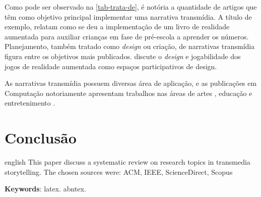 \documentclass[
article,			%
11pt,				%
oneside,			%
a4paper,			%
english,			%
brazil,				%
sumario=tradicional
]{abntex2}
\begin{document}
  Como pode ser observado na \autoref{tab-trata-de}, é notória a quantidade de artigos que têm como objetivo principal implementar uma narrativa transmídia. A título de exemplo,  relatam como se deu a implementação de um livro de realidade aumentada para auxiliar crianças em fase de pré-escola a aprender os números. Planejamento, também tratado como \textit{design} ou criação, de narrativas transmídia figura entre os objetivos mais publicados.  discute o \textit{design} e jogabilidade dos jogos de realidade aumentada como espaços participativos de design.

  As narrativas transmídia possuem diversas área de aplicação, e as publicações em Computação notoriamente apresentam trabalhos nas áreas de artes \cite{santorineos_2009,ha_2012,jung_2012,katifori_2014}, educação \cite{raybourn_2014,xiao_2013,mcauliffe_2011,ballagas_2011} e entretenimento \cite{willis_2013,choi_2010,evans_2014,nandakumar_2014,holler_2014,murakami_2015}.

  \section{Conclusão}

  


  \postextual


  \emptythanks
  \maketitle

  \renewcommand{\resumoname}{Abstract}
  \begin{resumoumacoluna}
    \begin{otherlanguage*}{english}
      This paper discuss a systematic review on research topics in transmedia storytelling. The chosen sources were: ACM, IEEE, ScienceDirect, Scopus

      \vspace{\onelineskip}

      \noindent
      \textbf{Keywords}: latex. abntex.
    \end{otherlanguage*}
  \end{resumoumacoluna}
\end{document}
